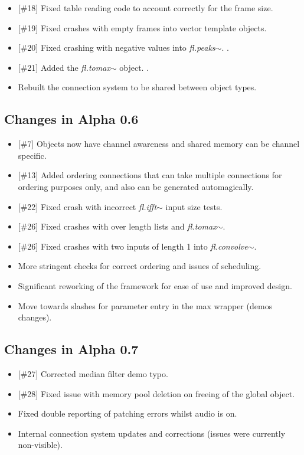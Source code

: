 \documentclass{article}
\newcommand{\flobject}[1]{\textit{fl.#1$\sim$}}
\begin{document}
\begin{itemize}
\item {[\#18]} Fixed table reading code to account correctly for the frame size.
\item {[\#19]} Fixed crashes with empty frames into vector template objects.
\item {[\#20]} Fixed crashing with negative values into \flobject{peaks}.
.\item {[\#21]} Added the \flobject{tomax} object.
.\item Rebuilt the connection system to be shared between object types.
\end{itemize}

\subsection{Changes in Alpha 0.6}
\vspace{0.1in}

\begin{itemize}
\item {[\#7]} Objects now have channel awareness and shared memory can be channel specific.
\item {[\#13]} Added ordering connections that can take multiple connections for ordering purposes only, and also can be generated automagically.
\item {[\#22]} Fixed crash with incorrect \flobject{ifft} input size tests.
\item {[\#26]} Fixed crashes with over length lists and \flobject{tomax}.
\item {[\#26]} Fixed crashes with two inputs of length 1 into \flobject{convolve}.
\item More stringent checks for correct ordering and issues of scheduling.
\item Significant reworking of the framework for ease of use and improved design.
\item Move towards slashes for parameter entry in the max wrapper (demos changes).
\end{itemize}

\subsection{Changes in Alpha 0.7}
\vspace{0.1in}

\begin{itemize}
\item {[\#27]} Corrected median filter demo typo.
\item {[\#28]} Fixed issue with memory pool deletion on freeing of the global object.
\item Fixed double reporting of patching errors whilst audio is on.
\item Internal connection system updates and corrections (issues were currently non-visible).
\end{itemize}
\end{document}
